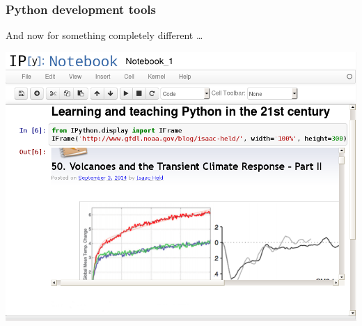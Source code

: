 \documentclass[xcolor=pdftex,dvipsnames,table]{beamer}
\begin{document}
\begin{frame}
  \frametitle{Python development tools}
  \begin{block}{And now for something completely different \ldots}
    \begin{overprint}
    \end{overprint}
  \end{block}
\end{frame}

\usebackgroundtemplate{}

\begin{frame}
\includegraphics[height=\textheight]{notebook.png}
\end{frame}
\end{document}
